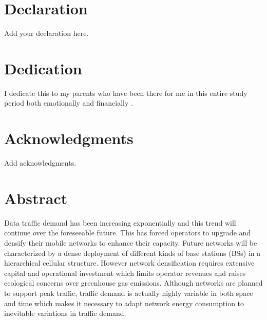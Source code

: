 \documentclass[12pt]{report}
\begin{document}
				



\section*{Declaration}

Add your declaration here.



\newpage


\section*{Dedication}

\vspace{2cm}
\begin{center}
I dedicate this to my parents who have been there for me in this entire study period both emotionally and financially .
\end{center}



\newpage

\section*{Acknowledgments}

Add acknowledgments. 


\lipsum[2-4]



\newpage



\section*{Abstract}


Data traffic demand has been increasing exponentially and this trend will continue over the foreseeable future. This has forced operators to upgrade and densify their mobile networks to enhance their capacity. Future networks will be characterized by a dense deployment of different kinds of base stations (BSs) in a hierarchical cellular structure. However network densification requires extensive capital and operational investment which limits operator revenues and raises ecological concerns over greenhouse gas emissions. Although networks are planned to support peak traffic, traffic demand is actually highly variable in both space and time which makes it necessary to adapt network energy consumption to inevitable variations in traffic demand. 
\end{document}
